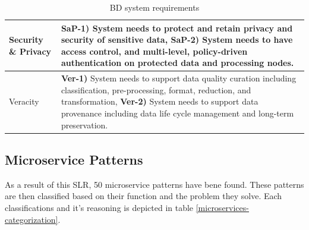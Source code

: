 \documentclass[conference]{IEEEtran}
\begin{document}
\begin{table}[h]
\begin{tabular}{|m{1.2cm}|m{16cm}|}
        Security \& Privacy & 
        
        \textbf{SaP-1)} System needs to protect and retain privacy and security of sensitive data, \textbf{SaP-2)} System needs to have access control, and multi-level, policy-driven authentication on protected data and processing nodes. 
        \\

        \hline
        
        Veracity &
        
        \textbf{Ver-1)} System needs to support data quality curation including classification, pre-processing, format, reduction, and  transformation, \textbf{Ver-2)} System needs to support data provenance including data life cycle management and long-term preservation.
        \\
        \hline
  
    \end{tabular}
    \caption{BD system requirements}
    \label{table-requirements}
    \end{table}


\subsection{Microservice Patterns}

As a result of this SLR, 50 microservice patterns have bene found. These patterns are then classified based on their function and the problem they solve. Each classifications and it's reasoning is depicted in table \ref{microservices-categorization}.
  
\end{document}
